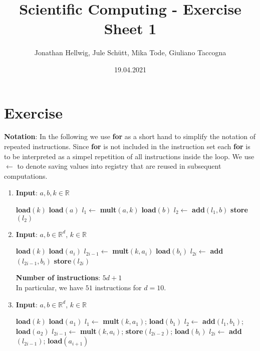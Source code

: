 \documentclass{article}
\title{Scientific Computing - Exercise Sheet 1}
\author{Jonathan Hellwig, Jule Schütt, Mika Tode, Giuliano Taccogna}
\date{19.04.2021}
\begin{document}
\maketitle

\section{Exercise}
\textbf{Notation}:
In the following we use \textbf{for} as a short hand to simplify the notation of repeated instructions. Since \textbf{for} is not included in the instruction set each \textbf{for} is to be interpreted as a simpel repetition of all instructions inside the loop. We use $ \gets $ to denote saving values into registry that are reused in subsequent computations.
\begin{enumerate}[label=(\alph*)]
  \item \textbf{Input}: $ a,b,k \in \mathbb{R}$
    \begin{algorithmic}[1]
      \State \textbf{load}$(k)$
      \State \textbf{load}$(a)$
      \State $l_1 \gets $ \textbf{mult}$(a,k)$
      \State \textbf{load}$(b)$
      \State $l_2 \gets $ \textbf{add}$(l_1, b)$
      \State \textbf{store}$(l_2)$
    \end{algorithmic}
  \item \textbf{Input}: $ a,b \in \mathbb{R}^d$, $k \in \mathbb{R}$\\
    \begin{algorithmic}[1]
      \State \textbf{load}$(k)$
      \State \textbf{load}$(a_i)$
      \State $l_{2i-1} \gets $ \textbf{mult}$(k, a_i)$
      \State \textbf{load}$(b_i)$
      \State $l_{2i} \gets $ \textbf{add}$(l_{2i-1}, b_i)$
      \State \textbf{store}$(l_{2i})$
      \EndFor
    \end{algorithmic}
    \textbf{Number of instructions}: $5d+1$ \\
    In particular, we have $51$ instructions for $d = 10$.
  \item \textbf{Input}: $ a,b \in \mathbb{R}^d$, $k \in \mathbb{R}$\\
    \begin{algorithmic}[1]
      \State \textbf{load}$(k)$
      \State \textbf{load}$(a_1)$
      \State $l_1 \gets $ \textbf{mult}$(k,a_1)$; \textbf{load}$(b_1)$
      \State $l_2 \gets $ \textbf{add}$(l_1, b_1)$; \textbf{load}$(a_2)$
      \State $l_{2i-1} \gets $ \textbf{mult}$(k,a_i)$; \textbf{store}$(l_{2i-2})$; \textbf{load}$(b_i)$
      \State $l_{2i} \gets $ \textbf{add}$(l_{2i-1})$; \textbf{load}$(a_{i+1})$

\end{algorithmic}
\end{enumerate}
\end{document}
